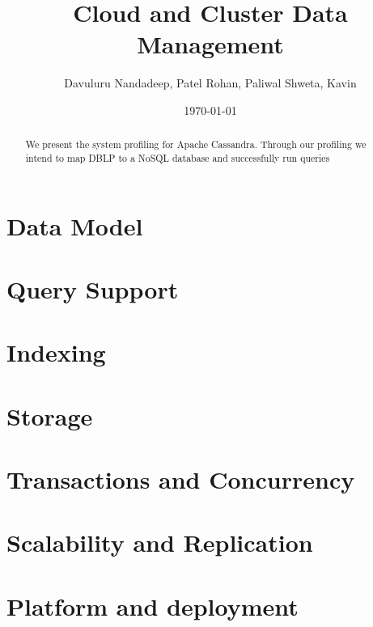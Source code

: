 \documentclass[a4paper]{article}
\title{Cloud and Cluster Data Management}
\author{Davuluru Nandadeep, Patel Rohan, Paliwal Shweta, Kavin}
\date{\today}
\begin{document}
\maketitle

\begin{abstract}
We present the system profiling for Apache Cassandra. Through our profiling we intend to map DBLP to a NoSQL database and successfully run queries
\end{abstract}

\section{Data Model}
\label{sec:modelling}



\section{Query Support}
\label{sec:queries}



\section{Indexing}
\label{sec:indexing}


\section{Storage}
\label{sec:storage}


\section{Transactions and Concurrency}
\label{sec:concurrency}


\section{Scalability and Replication}
\label{sec:scalability}


\section{Platform and deployment}
\label{sec:deploy}
\end{document}
